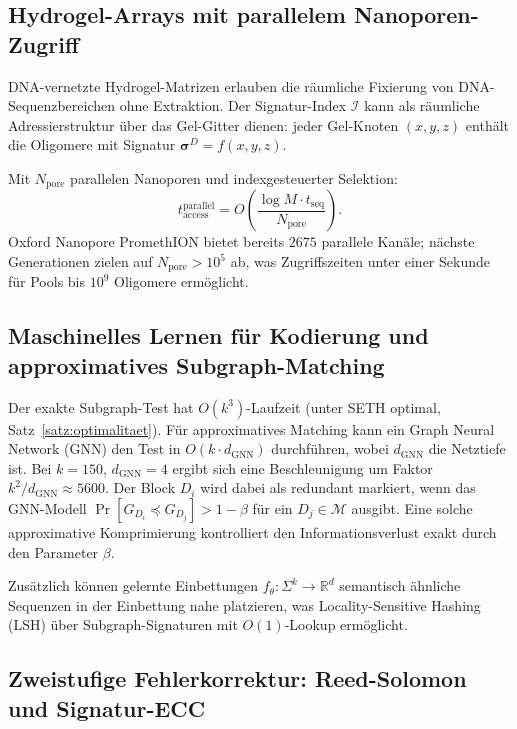 ﻿\documentclass[a4paper,12pt]{article}
\theoremstyle{definition}
\theoremstyle{plain}
\begin{document}
\subsection{Hydrogel-Arrays mit parallelem Nanoporen-Zugriff}
\label{ssec:hydrogel}

DNA-vernetzte Hydrogel-Matrizen erlauben die räumliche Fixierung von
DNA-Sequenz\-bereichen ohne Extraktion.  Der Signatur-Index $\mathcal{I}$
kann als räumliche Adressierstruktur über das Gel-Gitter dienen: jeder
Gel-Knoten $(x,y,z)$ enthält die Oligomere mit Signatur
$\boldsymbol{\sigma}^D = f(x,y,z)$.

Mit $N_{\mathrm{pore}}$ parallelen Nanoporen und indexgesteuerter Selektion:
\[
  t_{\mathrm{access}}^{\mathrm{parallel}}
  = O\!\left(\frac{\log M \cdot t_{\mathrm{seq}}}{N_{\mathrm{pore}}}\right).
\]
Oxford Nanopore PromethION bietet bereits $2675$ parallele Kanäle;
nächste Generationen zielen auf $N_{\mathrm{pore}} > 10^5$ ab, was
Zugriffszeiten unter einer Sekunde für Pools bis $10^9$ Oligomere
ermöglicht.

\subsection{Maschinelles Lernen für Kodierung und approximatives Subgraph-Matching}
\label{ssec:ml}

Der exakte Subgraph-Test hat $O(k^3)$-Laufzeit (unter SETH optimal,
Satz~\ref{satz:optimalitaet}).  Für approximatives Matching kann ein
Graph Neural Network (GNN) den Test in $O(k \cdot d_{\mathrm{GNN}})$
durchführen, wobei $d_{\mathrm{GNN}}$ die Netztiefe ist.  Bei
$k = 150$, $d_{\mathrm{GNN}} = 4$ ergibt sich eine Beschleunigung um
Faktor $k^2/d_{\mathrm{GNN}} \approx 5600$.  Der Block $D_i$ wird dabei
als redundant markiert, wenn das GNN-Modell
$\Pr[G_{D_i} \preceq G_{D_j}] > 1 - \beta$ für ein $D_j \in \mathcal{M}$
ausgibt.  Eine solche approximative Komprimierung kontrolliert den
Informationsverlust exakt durch den Parameter $\beta$.

Zusätzlich können gelernte Einbettungen
$f_\theta: \Sigma^k \to \mathbb{R}^d$ semantisch ähnliche Sequenzen in der
Einbettung nahe platzieren, was Locality-Sensitive Hashing (LSH) über
Subgraph-Signaturen mit $O(1)$-Lookup ermöglicht.

\subsection{Zweistufige Fehlerkorrektur: Reed-Solomon und Signatur-ECC}
\label{ssec:zweistufen_ecc}
\end{document}
